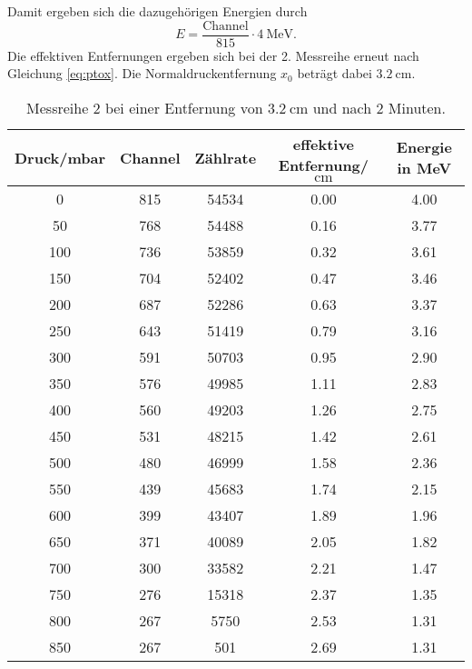 Damit ergeben sich die dazugehörigen Energien durch
\begin{equation}
  E=\frac{\text{Channel}}{815}\cdot \qty{4}{\mega\electronvolt}.
  \label{eq:En2}
\end{equation} 
Die effektiven Entfernungen ergeben sich bei der 2. Messreihe erneut nach Gleichung \eqref{eq:ptox}.
Die Normaldruckentfernung $x_0$ beträgt dabei $\qty{3.2}{\centi\meter}$.
\begin{table}[H]
  \centering
  \caption{Messreihe 2 bei einer Entfernung von $\qty{3.2}{\centi\meter}$ und nach 2 Minuten.}
  \label{tab:Mess2}
  \begin{tabular}{S[table-format=4] S[table-format=3] S[table-format=5] S[table-format=1.2] S[table-format=1.2]}
    \toprule
      {Druck/mbar} & {Channel} & {Zählrate}&{effektive Entfernung/$\unit{\centi\meter}$} &{Energie in MeV}\\
     & 815 & 54534 & 0.00 & 4.00 \\
      50 & 768 & 54488 & 0.16 & 3.77 \\
      100 & 736 & 53859 & 0.32 & 3.61 \\
      150 & 704 & 52402 & 0.47 & 3.46 \\
      200 & 687 & 52286 & 0.63 & 3.37 \\
      250 & 643 & 51419 & 0.79 & 3.16 \\
      300 & 591 & 50703 & 0.95 & 2.90 \\
      350 & 576 & 49985 & 1.11 & 2.83 \\
      400 & 560 & 49203 & 1.26 & 2.75 \\
      450 & 531 & 48215 & 1.42 & 2.61 \\
      500 & 480 & 46999 & 1.58 & 2.36 \\
      550 & 439 & 45683 & 1.74 & 2.15 \\
      600 & 399 & 43407 & 1.89 & 1.96 \\
      650 & 371 & 40089 & 2.05 & 1.82 \\
      700 & 300 & 33582 & 2.21 & 1.47 \\
      750 & 276 & 15318 & 2.37 & 1.35 \\
      800 & 267 & 5750 & 2.53 & 1.31 \\
      850 & 267 & 501 & 2.69 & 1.31 \\
      \bottomrule
  \end{tabular}
\end{table}
